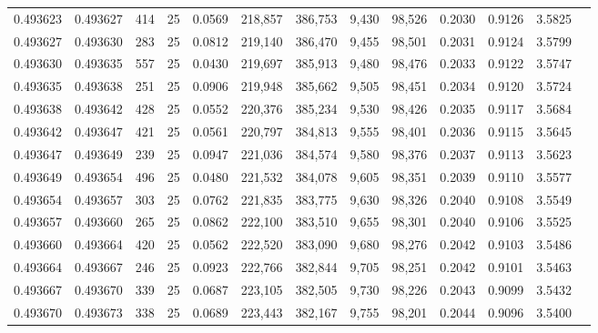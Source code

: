 \begin{tabular}{rrrrrrrrrrrrr}
0.493623 & 0.493627 &   414 &  25 &                                     0.0569 & 218,857 & 386,753 &   9,430 &  98,526 & 0.2030 & 0.9126 & 3.5825 \\
0.493627 & 0.493630 &   283 &  25 &                                     0.0812 & 219,140 & 386,470 &   9,455 &  98,501 & 0.2031 & 0.9124 & 3.5799 \\
0.493630 & 0.493635 &   557 &  25 &                                     0.0430 & 219,697 & 385,913 &   9,480 &  98,476 & 0.2033 & 0.9122 & 3.5747 \\
0.493635 & 0.493638 &   251 &  25 &                                     0.0906 & 219,948 & 385,662 &   9,505 &  98,451 & 0.2034 & 0.9120 & 3.5724 \\
0.493638 & 0.493642 &   428 &  25 &                                     0.0552 & 220,376 & 385,234 &   9,530 &  98,426 & 0.2035 & 0.9117 & 3.5684 \\
0.493642 & 0.493647 &   421 &  25 &                                     0.0561 & 220,797 & 384,813 &   9,555 &  98,401 & 0.2036 & 0.9115 & 3.5645 \\
0.493647 & 0.493649 &   239 &  25 &                                     0.0947 & 221,036 & 384,574 &   9,580 &  98,376 & 0.2037 & 0.9113 & 3.5623 \\
0.493649 & 0.493654 &   496 &  25 &                                     0.0480 & 221,532 & 384,078 &   9,605 &  98,351 & 0.2039 & 0.9110 & 3.5577 \\
0.493654 & 0.493657 &   303 &  25 &                                     0.0762 & 221,835 & 383,775 &   9,630 &  98,326 & 0.2040 & 0.9108 & 3.5549 \\
0.493657 & 0.493660 &   265 &  25 &                                     0.0862 & 222,100 & 383,510 &   9,655 &  98,301 & 0.2040 & 0.9106 & 3.5525 \\
0.493660 & 0.493664 &   420 &  25 &                                     0.0562 & 222,520 & 383,090 &   9,680 &  98,276 & 0.2042 & 0.9103 & 3.5486 \\
0.493664 & 0.493667 &   246 &  25 &                                     0.0923 & 222,766 & 382,844 &   9,705 &  98,251 & 0.2042 & 0.9101 & 3.5463 \\
0.493667 & 0.493670 &   339 &  25 &                                     0.0687 & 223,105 & 382,505 &   9,730 &  98,226 & 0.2043 & 0.9099 & 3.5432 \\
0.493670 & 0.493673 &   338 &  25 &                                     0.0689 & 223,443 & 382,167 &   9,755 &  98,201 & 0.2044 & 0.9096 & 3.5400 \\

\end{tabular}
